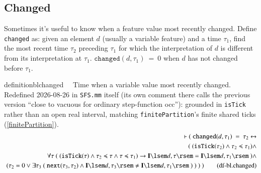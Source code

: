 \subsection{Changed}

\pn Sometimes it's useful to know when a feature value most recently changed.  Define \texttt{changed} as: given an element $d$ (usually a variable feature) and a time $\tau_1$, find the most recent time
$\tau_2$ preceding $\tau_1$ for which the interpretation of $d$ is different from its interpretation at $\tau_1$.
$\texttt{changed}(d,\tau_1)~=~0$ when $d$ has not changed before $\tau_1$.

\begin{restatable}{definition}{blchanged}~~ Time when a variable value most recently
changed. Redefined 2026-08-26 in \texttt{SFS.mm} itself (its own comment there calls the previous version
``close to vacuous for ordinary step-function occ''): grounded in \texttt{isTick} rather than an open real
interval, matching \texttt{finitePartition}'s finite shared ticks (\ref{finitePartition}).
\begin{align}
\vdash (~ \texttt{changed}(d,\tau_1)~=~\tau_2 \leftrightarrow \notag \\
 (~( \texttt{isTick}(\tau_2) \wedge \tau_2 \preccurlyeq \tau_1 ) \wedge \notag \\
 ~\forall \tau~(~( \texttt{isTick}(\tau) \wedge \tau_2 \preccurlyeq \tau \wedge \tau \preccurlyeq \tau_1 ) \rightarrow \mathbf{I}\lsem d,\tau\rsem = \mathbf{I}\lsem d,\tau_1\rsem~) \wedge \notag \\
 ~( \tau_2 = 0 \vee \exists \tau_3~(~\texttt{next}(\tau_3,\tau_2) \wedge \mathbf{I}\lsem d,\tau_3\rsem \neq \mathbf{I}\lsem d,\tau_1\rsem~)~)~)~)
\label{eq:df-bl.changed}\tag{df-bl.changed}
\end{align}
\end{restatable}


